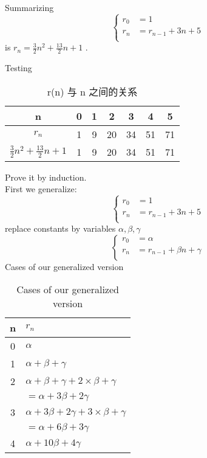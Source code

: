 Summarizing 
\begin{equation*}
    \left\{
        \begin{array}{ll}
            r_0 &= 1\\
            r_n &= r_{n-1}+3n+5\\
        \end{array}
    \right.
\end{equation*}
is $ r_n=\frac{3}{2}n^2+\frac{13}{2}n+1 $ .

Testing
\begin{table}[htbp]
	\centering
	\small
	\caption{r(n) 与 n 之间的关系}
	\begin{tabular}{c|ccc ccc}
		\toprule
		n & 0 & 1 & 2 & 3 & 4 & 5 \\  
		\midrule
		$ r_n $ & 1 & 9 & 20 & 34 & 51 & 71\\
        $ \frac{3}{2}n^2+\frac{13}{2}n+1 $ & 1 & 9 & 20 & 34 & 51 & 71\\
		\bottomrule
	\end{tabular}%
	\label{tab:rnCompare}%
\end{table}%

Prove it by induction.\\
First we generalize:
\begin{equation*}
    \left\{
        \begin{array}{ll}
            r_0 &= 1\\
            r_n &= r_{n-1}+3n+5\\
        \end{array}
    \right.
\end{equation*}
replace constants by variables $ \alpha, \beta,\gamma $ 
\begin{equation*}
    \left\{
        \begin{array}{ll}
            r_0 &= \alpha\\
            r_n &= r_{n-1}+\beta n+\gamma\\
        \end{array}
    \right.
\end{equation*}
Cases of our generalized version
\begin{table}[htbp]
	\centering
	\small
	\caption{Cases of our generalized version}
	\begin{tabular}{cl}
		\toprule
		n & $ r_n $ \\  
		\midrule
        0   & $ \alpha $     \\
        1   & $ \alpha + \beta + \gamma $    \\
        2   & $ \alpha + \beta + \gamma + 2\times \beta + \gamma  $   \\
            & $ = \alpha + 3\beta + 2\gamma $ \\
        3   & $ \alpha + 3\beta + 2\gamma + 3\times \beta + \gamma $ \\
            & $ = \alpha + 6\beta + 3\gamma $   \\
        4   & $ \alpha + 10\beta + 4\gamma $ \\
		\bottomrule
	\end{tabular}%
	\label{tab:casesofgene}%
\end{table}%

